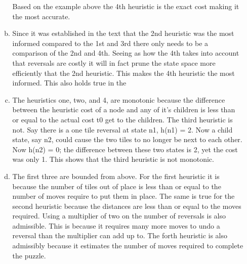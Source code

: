 \documentclass[11pt]{article}
\begin{document}
\begin{enumerate}[1.]
\begin{enumerate}[a.]
Based on the example above the 4th heuristic is the exact cost making it the most accurate.\\
  \item
  Since it was established in the text that the 2nd heuristic was the most informed compared to the 1st and 3rd there only needs to be a comparison of the 2nd and 4th. Seeing as how the 4th takes into account that reversals are costly it will in fact prune the state space more efficiently that the 2nd heuristic. This makes the 4th heuristic the most informed. This also holds true in the \\
  \item
  The heuristics one, two, and 4, are monotonic because the difference between the heuristic cost of a node and any of it's children is less than or equal to the actual cost t0 get to the children. The third heuristic is not. Say there is a one tile reversal at state n1, h(n1) = 2. Now a child state, say n2, could cause the two tiles to no longer be next to each other. Now h(n2) = 0; the difference between these two states is 2, yet the cost was only 1. This shows that the third heuristic is not monotonic.  
  \item
  The first three are bounded from above. For the first heuristic it is because the number of tiles out of place is less than or equal to the number of moves require to put them in place. The same is true for the second heuristic because the distances are less than or equal to the moves required. Using a multiplier of two on the number of reversals is also admissible. This is because it requires many more moves to undo a reversal than the multiplier can add up to. The forth heuristic is also admissibly because it estimates the number of moves required to complete the puzzle.\\
  \end{enumerate}
\end{enumerate}
\end{document}
